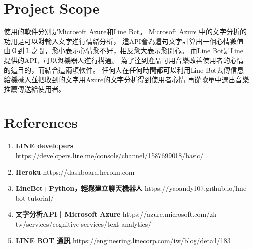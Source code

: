 \documentclass{scrreprt}
\begin{document}
\section{Project Scope}
\begin{CJK}{UTF8}{<font>}
        使用的軟件分別是Microsoft Azure和Line Bot。
Microsoft Azure 中的文字分析的功用是可以對輸入文字進行情緒分析，
這API會為這句文字計算出一個心情數值由０到１之間，愈小表示心情愈不好，相反愈大表示愈開心。
而Line Bot是Line提供的API，可以與機器人進行構通。
為了達到產品可用音樂改善使用者的心情的這目的，而結合這兩項軟件。
任何人在任何時間都可以利用Line Bot去傳信息給機械人並把收到的文字用Azure的文字分析得到使用者心情
再從歌單中選出音樂推薦傳送給使用者。
\end{CJK}

\section{References}
\begin{CJK}{UTF8}{<font>}
\begin{enumerate} 
	\item \textbf {LINE developers} \newline
	https://developers.line.me/console/channel/1587699018/basic/
	\item  \textbf {Heroku} \newline
	https://dashboard.heroku.com
	\item \textbf {LineBot+Python，輕鬆建立聊天機器人} \newline
	https://yaoandy107.github.io/line-bot-tutorial/  
	\item  \textbf {文字分析API | Microsoft Azure}  \newline
	https://azure.microsoft.com/zh-tw/services/cognitive-services/text-analytics/
	\item  \textbf { LINE BOT 通訊}  \newline
	https://engineering.linecorp.com/tw/blog/detail/183
\end{enumerate}
\end{CJK}
\end{document}
